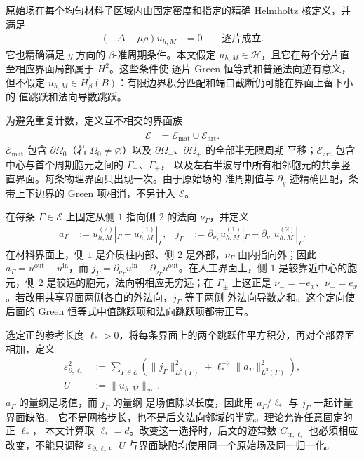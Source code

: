 原始场在每个均匀材料子区域内由固定密度和指定的精确 Helmholtz 核定义，并满足
\begin{align}
  (-\Delta-\mu\rho)u_{h,M}&=0
  \qquad\text{逐片成立}.
  \label{eq:raw-piecewise-pde}
\end{align}
它也精确满足 $y$ 方向的 $\beta$-准周期条件。本文假定
$u_{h,M}\in\mathcal H$，且它在每个分片直至相应界面局部属于 $H^2$。这些条件使
逐片 Green 恒等式和普通法向迹有意义，但不假定
$u_{h,M}\in H^1_\beta(B)$：有限边界积分匹配和端口截断仍可能在界面上留下小的
值跳跃和法向导数跳跃。

为避免重复计数，定义互不相交的界面族
\begin{align}
  \mathscr E&=\mathscr E_{\mathrm{mat}}\mathbin{\dot\cup}
  \mathscr E_{\mathrm{art}}.
  \label{eq:certification-interface-family}
\end{align}
$\mathscr E_{\mathrm{mat}}$ 包含 $\partial\Omega_0$（若
$\Omega_0\ne\varnothing$）以及 $\partial\Omega_-$、$\partial\Omega_+$ 的全部半无限周期
平移；$\mathscr E_{\mathrm{art}}$ 包含中心与首个周期胞元之间的 $\Gamma_-$、$\Gamma_+$，
以及左右半波导中所有相邻胞元的共享竖直界面。每条物理界面只出现一次。由于原始场的
准周期值与 $\partial_y$ 迹精确匹配，条带上下边界的 Green 项相消，不另计入
$\mathscr E$。

在每条 $\Gamma\in\mathscr E$ 上固定从侧 $1$ 指向侧 $2$ 的法向 $\nu_\Gamma$，并定义
\begin{align}
  a_\Gamma
  &:=u_{h,M}^{(2)}|_\Gamma
    -u_{h,M}^{(1)}|_\Gamma,
  &j_\Gamma
  &:=\partial_{\nu_\Gamma}u_{h,M}^{(1)}|_\Gamma
    -\partial_{\nu_\Gamma}u_{h,M}^{(2)}|_\Gamma.
  \label{eq:raw-interface-jumps}
\end{align}
在材料界面上，侧 $1$ 是介质柱内部、侧 $2$ 是外部，$\nu_\Gamma$ 由内指向外；因此
$a_\Gamma=u^{\mathrm{out}}-u^{\mathrm{in}}$，而
$j_\Gamma=\partial_{\nu_\Gamma}u^{\mathrm{in}}
-\partial_{\nu_\Gamma}u^{\mathrm{out}}$。在人工界面上，侧 $1$ 是较靠近中心的胞元，侧
$2$ 是较远的胞元，法向朝相应无穷远；在 $\Gamma_\pm$ 上这正是
$\nu_-=-e_x$、$\nu_+=e_x$。若改用共享界面两侧各自的外法向，$j_\Gamma$ 等于两侧
外法向导数之和。这个定向使后面的 Green 恒等式中值跳跃项和法向跳跃项都带正号。

选定正的参考长度 $\ell_*>0$，将每条界面上的两个跳跃作平方积分，再对全部界面相加，定义
\begin{align}
  \varepsilon_{\partial,\ell_*}^2
  &:={}
  \sum_{\Gamma\in\mathscr E}
  \left(
    \lVert j_\Gamma\rVert_{L^2(\Gamma)}^2
    +\ell_*^{-2}\lVert a_\Gamma\rVert_{L^2(\Gamma)}^2
  \right),
  \label{eq:boundary-defect-norm}\\
  U&:=\lVert u_{h,M}\rVert_{\mathcal H}.
  \label{eq:raw-field-mass}
\end{align}
$a_\Gamma$ 的量纲是场值，而 $j_\Gamma$ 的量纲
是场值除以长度，因此用 $a_\Gamma/\ell_*$ 与 $j_\Gamma$ 一起计量界面缺陷。
它不是网格步长，也不是后文法向邻域的半宽。理论允许任意固定的正 $\ell_*$，
本文计算取 $\ell_*=d$。改变这一选择时，后文的迹常数
$C_{\mathrm{tr},\ell_*}$ 也必须相应改变，不能只调整
$\varepsilon_{\partial,\ell_*}$。$U$ 与界面缺陷均使用同一个原始场及同一归一化。

